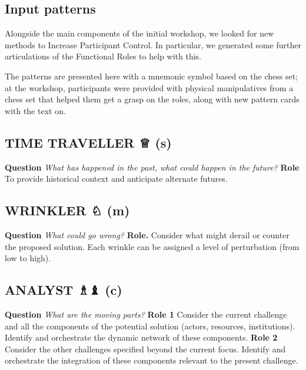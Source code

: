 \documentclass[acmlarge,timestamp]{acmart}
\newcommand{\sensory}{(s)}
\newcommand{\cognitive}{(c)}
\newcommand{\motor}{(m)}
\begin{document}
\subsection{Input patterns}

Alongside the main components of the initial workshop, we looked for
new methods to {\sc Increase Participant Control}.  In particular, we
generated some further articulations of the {\sc Functional Roles} to
help with this.

The patterns are presented here with a mnemonic symbol based on the
chess set; at the workshop, participants were provided with physical
manipulatives from a chess set that helped them get a grasp on the
roles, along with new pattern cards with the text on.

\subsection*{TIME TRAVELLER {\chess ♕} {\hfill \sensory}}

\textbf{Question} \emph{What has happened in the past, what could
happen in the future?}\newline
\textbf{Role} To provide historical context and
anticipate alternate futures.

\subsection*{WRINKLER {\chess ♘} {\hfill \motor}}

\textbf{Question} \emph{What could go wrong? }\newline
\textbf{Role.} Consider what might derail or counter
the proposed solution.  Each wrinkle can be assigned a level of
perturbation (from low to high).

\subsection*{ANALYST {\chess ♗♝} {\hfill \cognitive}}

\textbf{Question} \emph{What are the moving parts?}\newline
\textbf{Role 1} Consider the current challenge and all the components
of the potential solution (actors, resources, institutions). Identify
and orchestrate the dynamic network of these components.\newline
\textbf{Role 2} Consider the other challenges specified beyond the
current focus.  Identify and orchestrate the integration of these
components relevant to the present challenge.
\end{document}
